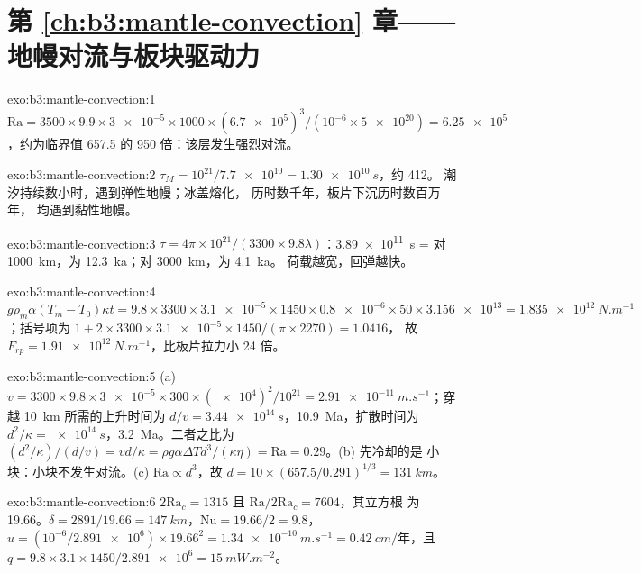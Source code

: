 \section*{第 \ref{ch:b3:mantle-convection} 章——地幔对流与板块驱动力}

\begin{solution}{exo:b3:mantle-convection:1}
$\mathrm{Ra} = 3500\times9.9\times\num{3e-5}\times1000\times(\num{6.7e5})^3/
(10^{-6}\times\num{5e20}) = \num{6.25e5}$，约为临界值
657.5 的 950 倍：该层发生强烈对流。
\end{solution}

\begin{solution}{exo:b3:mantle-convection:2}
$\tau_M = 10^{21}/\num{7.7e10} = \qty{1.30e10}{s}$，约 \qty{412}{}。
潮汐持续数小时，遇到弹性地幔；冰盖熔化，
历时数千年，板片下沉历时数百万年，
均遇到黏性地幔。
\end{solution}

\begin{solution}{exo:b3:mantle-convection:3}
$\tau = 4\pi\times10^{21}/(3300\times9.8\lambda)$：\qty{3.89e11}{s} =
对 \qty{1000}{km}，为 \qty{12.3}{ka}；对 \qty{3000}{km}，为 \qty{4.1}{ka}。
荷载越宽，回弹越快。
\end{solution}

\begin{solution}{exo:b3:mantle-convection:4}
$g\rho_m\alpha(T_m - T_0)\kappa t = 9.8\times3300\times\num{3.1e-5}\times1450
\times\num{0.8e-6}\times50\times\num{3.156e13} = \qty{1.835e12}{N.m^{-1}}$；括号项为
$1 + 2\times3300\times\num{3.1e-5}\times1450/(\pi\times2270) = 1.0416$，
故 $F_{rp} = \qty{1.91e12}{N.m^{-1}}$，比板片拉力小 24 倍。
\end{solution}

\begin{solution}{exo:b3:mantle-convection:5}
(a) $v = 3300\times9.8\times\num{3e-5}\times300\times(\num{e4})^2/10^{21} =
\qty{2.91e-11}{m.s^{-1}}$；穿越 \qty{10}{km} 所需的上升时间为 $d/v =
\qty{3.44e14}{s}$，\qty{10.9}{Ma}，扩散时间为 $d^2/\kappa =
\qty{e14}{s}$，\qty{3.2}{Ma}。二者之比为 $(d^2/\kappa)/(d/v) =
vd/\kappa = \rho g\alpha\Delta Td^3/(\kappa\eta) = \mathrm{Ra} = 0.29$。(b) 先冷却的是
小块：小块不发生对流。(c) $\mathrm{Ra} \propto d^3$，故 $d =
10\times(657.5/0.291)^{1/3} = \qty{131}{km}$。
\end{solution}

\begin{solution}{exo:b3:mantle-convection:6}
$2\mathrm{Ra}_c = 1315$ 且 $\mathrm{Ra}/2\mathrm{Ra}_c = 7604$，其立方根
为 19.66。$\delta = 2891/19.66 = \qty{147}{km}$，$\mathrm{Nu} = 19.66/2 =
9.8$，$u = (10^{-6}/\num{2.891e6})\times19.66^2 = \qty{1.34e-10}{m.s^{-1}} =
\qty{0.42}{cm/\text{年}}$，且 $q = 9.8\times3.1\times1450/\num{2.891e6} =
\qty{15}{mW.m^{-2}}$。
\end{solution}

